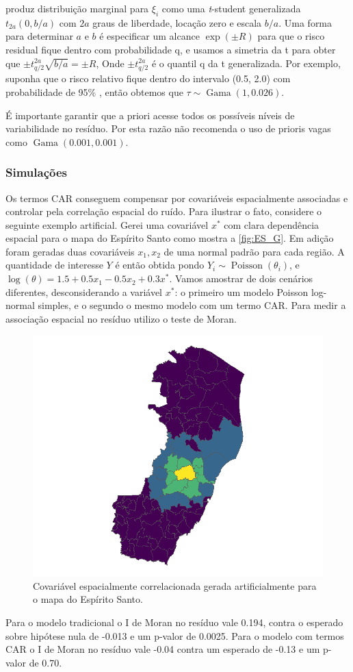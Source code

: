 produz distribuição marginal para $\xi_i$ como uma \textit{t}-student generalizada $t_{2a}(0, b/a)$ com $2a$ graus de liberdade, locação zero e escala $b/a$. Uma forma para determinar $a$ e $b$ é especificar um alcance $\exp(\pm R)$ para que o risco residual fique dentro com probabilidade q, e usamos a simetria da t para obter que $\pm t_{q/2}^{2a} \sqrt{b/a} = \pm R$, Onde $\pm t_{q/2}^{2a}$ é o quantil q da t generalizada. Por exemplo, suponha que o risco relativo fique dentro do intervalo (0.5, 2.0) com probabilidade de 95\% , então obtemos que $\tau \sim \operatorname{Gama}(1,0.026)$. 

É importante garantir que a priori acesse todos os possíveis níveis de variabilidade no resíduo. Por esta razão \textcite{Wakefield2007} não recomenda o uso de prioris vagas como $\operatorname{Gama}(0.001,0.001)$.

\subsubsection{Simulações}

Os termos CAR conseguem compensar por covariáveis espacialmente associadas e controlar pela correlação espacial do ruído.
Para ilustrar o fato, considere o seguinte exemplo artificial. Gerei uma covariável $x^*$ com clara dependência espacial para o mapa do Espírito Santo como mostra a \autoref{fig:ES_G}. Em adição foram geradas duas covariáveis $x_1, x_2$ de uma normal padrão para cada região.
A quantidade de interesse $Y$ é então obtida pondo $Y_i \sim \operatorname{Poisson}(\theta_i)$, e $\log(\theta) = 1.5 + 0.5x_1 -0.5x_2 + 0.3x^*$. Vamos amostrar de dois cenários diferentes, desconsiderando a variável $x^*$: o primeiro um modelo Poisson log-normal simples, e o segundo o mesmo modelo com um termo CAR.
Para medir a associação espacial no resíduo utilizo o teste de Moran.
\begin{figure}[ht]
    \centering
    \includegraphics[width = 0.6\linewidth]{images/ES_G.png}
    \caption{Covariável espacialmente correlacionada gerada artificialmente para o mapa do Espírito Santo. }
    \label{fig:ES_G}
\end{figure}
Para o modelo tradicional o I de Moran no resíduo vale 0.194, contra o esperado sobre hipótese nula de -0.013 e um p-valor de 0.0025. Para o modelo com termos CAR o I de Moran no resíduo vale -0.04 contra um esperado de -0.13 e um p-valor de 0.70. 

